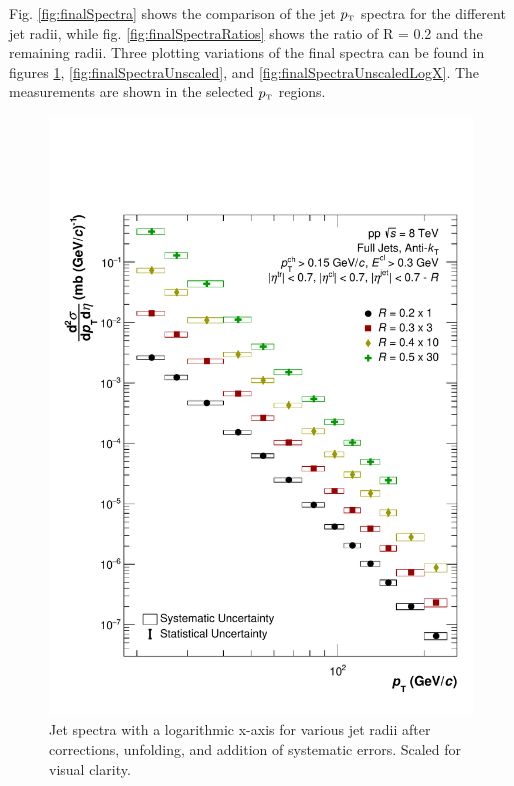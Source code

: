 \documentclass[ALICE]{ALICE_analysis_notes}
\newcommand{\pT}{$p_{\mbox{\tiny T}}$\xspace}
\begin{document}
Fig. \ref{fig:finalSpectra} shows the comparison of the jet \pT spectra for the different jet radii, while fig. \ref{fig:finalSpectraRatios} shows the ratio of R = 0.2 and the remaining radii. Three plotting variations of the final spectra can be found in figures \ref{fig:finalSpectraLogX}, \ref{fig:finalSpectraUnscaled}, and \ref{fig:finalSpectraUnscaledLogX}.
The measurements are shown in the selected \pT regions.

\begin{figure}
    \centering
    \includegraphics[width=15cm]{figures/FinalResults/Bayes_reg6_logx.pdf}
    \caption{Jet spectra with a logarithmic x-axis for various jet radii after corrections, unfolding, and addition of systematic errors. Scaled for visual clarity.}
    \label{fig:finalSpectraLogX}
\end{figure}
\end{document}
